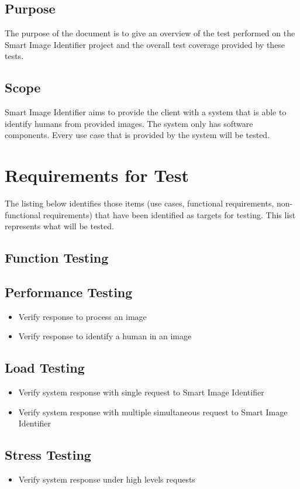 \documentclass[a4paper,12pt]{report}
\begin{document}
	\subsection {Purpose}
		The purpose of the document is to give an overview of the test performed on the Smart Image Identifier project and the overall test coverage provided by these tests.
	\subsection {Scope}
		Smart Image Identifier aims to provide the client with a system that is able to identify humans from provided images. The system only has software components.
		Every use case that is provided by the system will be tested.
		
\section {Requirements for Test}
	The listing below identifies those items (use cases, functional requirements, non-functional requirements) that have been identified as targets for testing. 
	This list represents what will be tested.
	
	\subsection {Function Testing}
	\subsection {Performance Testing}
		\begin {itemize}
			\item Verify response to process an image
			\item Verify response to identify a human in an image
		\end {itemize}
	\subsection {Load Testing}
		\begin {itemize}
			\item Verify system response with single request to Smart Image Identifier
			\item Verify system response with multiple simultaneous request to Smart Image Identifier
		\end {itemize}
	\subsection {Stress Testing}
		\begin {itemize}
			\item Verify system response under high levels requests
		\end {itemize}
\end{document}
